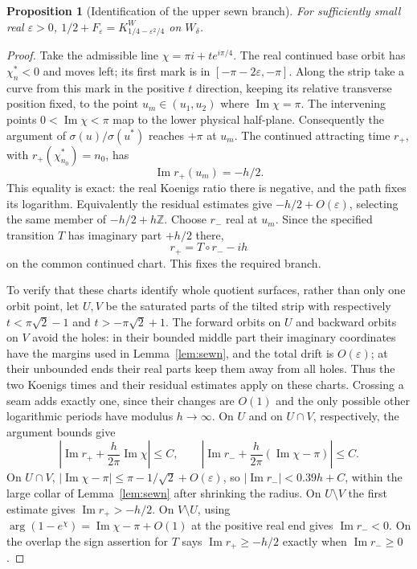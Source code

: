\documentclass[11pt]{article}
\newtheorem{proposition}[theorem]{Proposition}
\newcommand{\im}{\operatorname{Im}}
\begin{document}
\begin{proposition}[Identification of the upper sewn branch]
\label{prop:sewn-identification}
For sufficiently small real $\varepsilon>0$,
$1/2+F_\varepsilon=K_{1/4-\varepsilon^2/4}^W$ on $W_\delta$.
\end{proposition}
\begin{proof}
Take the admissible line $\chi=\pi i+t e^{i\pi/4}$.
The real continued base orbit has $\chi_n^*<0$ and moves left;
its first mark is in $[-\pi-2\varepsilon,-\pi]$.
Along the strip take a curve from this mark in the positive $t$
direction, keeping its relative transverse position fixed, to the
point $u_m\in(u_1,u_2)$ where $\im\chi=\pi$.
The intervening points $0<\im\chi<\pi$ map to the lower physical
half-plane. Consequently the argument of
$\sigma(u)/\sigma(u^*)$ reaches $+\pi$ at $u_m$. The continued
attracting time $r_+$, with $r_+(\chi_{n_0}^*)=n_0$, has
\[
 \im r_+(u_m)=-h/2.
\]
This equality is exact: the real Koenigs ratio there is negative,
and the path fixes its logarithm. Equivalently the residual estimates
give $-h/2+O(\varepsilon)$, selecting the same member of
$-h/2+h\mathbb Z$. Choose $r_-$ real at $u_m$.
Since the specified transition $T$ has imaginary part $+h/2$ there,
\[
 r_+=T\circ r_--ih
\]
on the common continued chart. This fixes the required branch.

To verify that these charts identify whole quotient surfaces, rather
than only one orbit point, let $U,V$ be the saturated parts of the
tilted strip with respectively
$t<\pi\sqrt2-1$ and $t>-\pi\sqrt2+1$.
The forward orbits on $U$ and backward orbits on $V$ avoid the holes:
in their bounded middle part their imaginary coordinates have the
margins used in Lemma~\ref{lem:sewn}, and the total drift is
$O(\varepsilon)$; at their unbounded ends their real parts keep them
away from all holes. Thus the two Koenigs times and their residual
estimates apply on these charts. Crossing a seam adds exactly one,
since their changes are $O(1)$ and the only possible other logarithmic
periods have modulus $h\to\infty$.
On $U$ and on $U\cap V$, respectively, the argument bounds give
\[
 \left|\im r_++\frac h{2\pi}\im\chi\right|\le C,
 \qquad
 \left|\im r_-+\frac h{2\pi}(\im\chi-\pi)\right|\le C.
\]
On $U\cap V$, $|\im\chi-\pi|\le\pi-1/\sqrt2+O(\varepsilon)$,
so $|\im r_-|<0.39h+C$, within the large collar of
Lemma~\ref{lem:sewn} after shrinking the radius.
On $U\setminus V$ the first estimate gives $\im r_+>-h/2$.
On $V\setminus U$, using
$\arg(1-e^\chi)=\im\chi-\pi+O(1)$ at the positive real end gives
$\im r_-<0$. On the overlap the sign assertion for $T$ says
$\im r_+\ge-h/2$ exactly when $\im r_-\ge0$.


\end{proof}
\end{document}
